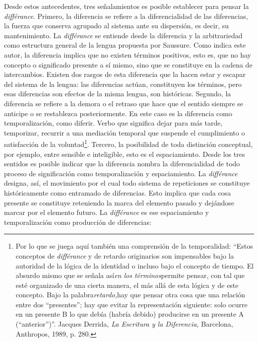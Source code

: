 Desde estos antecedentes, tres señalamientos es posible establecer para
pensar la \emph{différance}. Primero, la diferencia se refiere a la
diferencialidad de las diferencias, la fuerza que conserva agrupado al
sistema ante su dispersión, es decir, su mantenimiento. La
\emph{différance} se entiende desde la diferencia y la arbitrariedad
como estructura general de la lengua propuesta por Saussure. Como indica
este autor, la diferencia implica que no existen términos positivos,
esto es, que no hay concepto o significado presente a sí mismo, sino que
se constituye en la cadena de intercambios. Existen dos rasgos de esta
diferencia que la hacen estar y escapar del sistema de la lengua: las
diferencias actúan, constituyen los términos, pero esas diferencias son
efectos de la misma lengua, son históricas. Segundo, la diferencia se
refiere a la demora o el retraso que hace que el sentido siempre se
anticipe o se restablezca posteriormente. En este caso es la diferencia
como temporalización, como diferir. Verbo que significa dejar para más
tarde, temporizar, recurrir a una mediación temporal que suspende el
cumplimiento o satisfacción de la voluntad\footnote{Por lo que se juega
  aquí también una comprensión de la temporalidad: \enquote{Estos conceptos de
  \emph{différance} y de retardo originarios son impensables bajo la
  autoridad de la lógica de la identidad o incluso bajo el concepto de
  tiempo. El absurdo mismo que se señala así\emph{en los
  términos}permite pensar, con tal que esté organizado de una cierta
  manera, el más allá de esta lógica y de este concepto. Bajo la
  palabra\emph{retardo,}hay que pensar otra cosa que una relación entre
  dos ``presentes''; hay que evitar la representación siguiente: solo
  ocurre en un presente B lo que debía (habría debido) producirse en un
  presente A (``anterior'')}. Jacques Derrida, \emph{La Escritura y la
  Diferencia,} Barcelona, Anthropos, 1989, p. 280.}. Tercero, la
posibilidad de toda distinción conceptual, por ejemplo, entre sensible e
inteligible, esto es el espaciamiento. Desde los tres sentidos es
posible indicar que la diferencia nombra la diferencialidad de todo
proceso de significación como temporalización y espaciamiento. La
\emph{différance} designa, así, el movimiento por el cual todo sistema
de repeticiones se constituye históricamente como entramado de
diferencias. Esto implica que cada cosa presente se constituye
reteniendo la marca del elemento pasado y dejándose marcar por el
elemento futuro. La \emph{différance} es ese espaciamiento y
temporalización como producción de diferencias:

